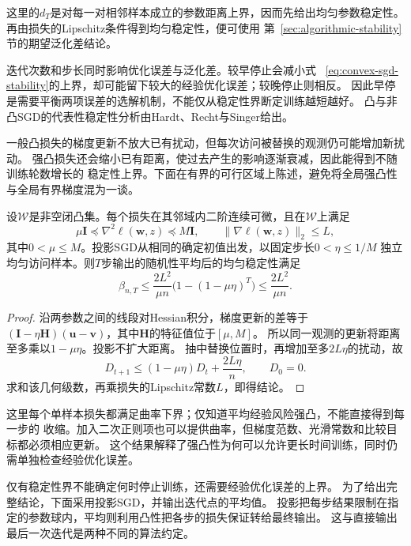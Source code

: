 这里的$d_T$是对每一对相邻样本成立的参数距离上界，因而先给出均匀参数稳定性。
再由损失的Lipschitz条件得到均匀稳定性，便可使用
第~\ref{sec:algorithmic-stability}节的期望泛化差结论。

迭代次数和步长同时影响优化误差与泛化差。较早停止会减小式
~\eqref{eq:convex-sgd-stability}的上界，却可能留下较大的经验优化误差；较晚停止则相反。
因此早停是需要平衡两项误差的选解机制，不能仅从稳定性界断定训练越短越好。
凸与非凸SGD的代表性稳定性分析由Hardt、Recht与Singer给出。


一般凸损失的梯度更新不放大已有扰动，但每次访问被替换的观测仍可能增加新扰动。
强凸损失还会缩小已有距离，使过去产生的影响逐渐衰减，因此能得到不随训练轮数增长的
稳定性上界。下面在有界的可行区域上陈述，避免将全局强凸性与全局有界梯度混为一谈。

\begin{theorem}[强凸投影SGD的稳定性]
\label{thm:strongly-convex-sgd-stability}
设$\mathcal W$是非空闭凸集。每个损失在其邻域内二阶连续可微，且在$\mathcal W$上满足
\[
 \mu\bm I\preceq\nabla^2\ell(\bm w,z)\preceq M\bm I,
 \qquad \|\nabla\ell(\bm w,z)\|_2\leq L,
\]
其中$0<\mu\leq M$。投影SGD从相同的确定初值出发，以固定步长$0<\eta\leq1/M$
独立均匀访问样本。则$T$步输出的随机性平均后的均匀稳定性满足
\[
 \beta_{n,T}\leq\frac{2L^2}{\mu n}
           \bigl(1-(1-\mu\eta)^T\bigr)
 \leq\frac{2L^2}{\mu n}.
\]
\end{theorem}
\begin{proof}
沿两参数之间的线段对Hessian积分，梯度更新的差等于
$(\bm I-\eta\bm H)(\bm u-\bm v)$，其中$\bm H$的特征值位于$[\mu,M]$。
所以同一观测的更新将距离至多乘以$1-\mu\eta$。投影不扩大距离。
抽中替换位置时，再增加至多$2L\eta$的扰动，故
\[
 D_{t+1}\leq(1-\mu\eta)D_t+\frac{2L\eta}{n},\qquad D_0=0.
\]
求和该几何级数，再乘损失的Lipschitz常数$L$，即得结论。
\end{proof}

这里每个单样本损失都满足曲率下界；仅知道平均经验风险强凸，不能直接得到每一步的
收缩。加入二次正则项也可以提供曲率，但梯度范数、光滑常数和比较目标都必须相应更新。
这个结果解释了强凸性为何可以允许更长时间训练，同时仍需单独检查经验优化误差。

仅有稳定性界不能确定何时停止训练，还需要经验优化误差的上界。
为了给出完整结论，下面采用投影SGD，并输出迭代点的平均值。
投影把每步结果限制在指定的参数球内，平均则利用凸性把各步的损失保证转给最终输出。
这与直接输出最后一次迭代是两种不同的算法约定。

